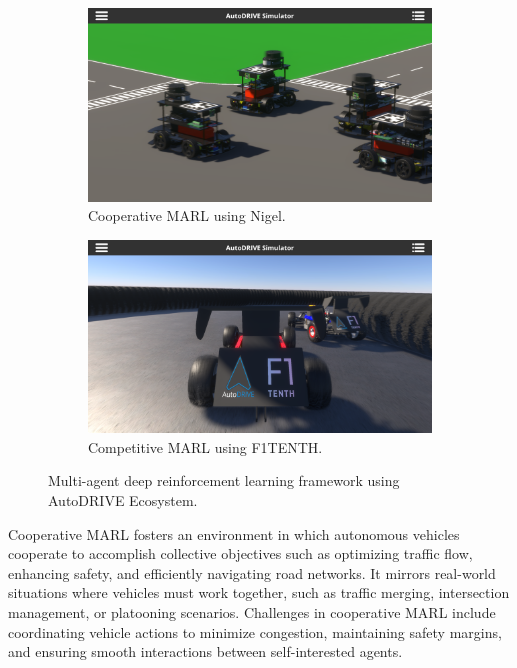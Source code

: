 \documentclass[letterpaper, 10 pt, conference]{ieeeconf}  %
\begin{document}
\begin{figure}[t]
     \centering
     \begin{subfigure}[b]{\linewidth}
         \centering
         \includegraphics[width=\linewidth]{Fig1a.png}
         \caption{Cooperative MARL using Nigel.}
         \label{fig1a}
     \end{subfigure}
     \hfill
     \begin{subfigure}[b]{\linewidth}
         \centering
         \includegraphics[width=\linewidth]{Fig1b.png}
         \caption{Competitive MARL using F1TENTH.}
         \label{fig1b}
     \end{subfigure}
     \caption{Multi-agent deep reinforcement learning framework using AutoDRIVE Ecosystem.}
    \label{fig1}
\end{figure}

Cooperative MARL \cite{semnani2020multiagent, long2018optimally, aradi2020survey, wang2020mrcdrl, zhou2019learn, 9316033} fosters an environment in which autonomous vehicles cooperate to accomplish collective objectives such as optimizing traffic flow, enhancing safety, and efficiently navigating road networks. It mirrors real-world situations where vehicles must work together, such as traffic merging, intersection management, or platooning scenarios. Challenges in cooperative MARL include coordinating vehicle actions to minimize congestion, maintaining safety margins, and ensuring smooth interactions between self-interested agents.
\end{document}
